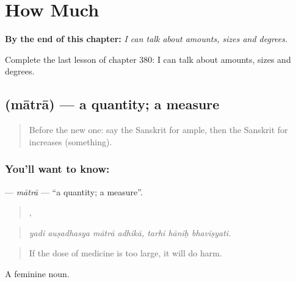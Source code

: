 
\chapter{How Much}
\label{ch:sa-how-much}

\begin{chapteropening}
\textbf{By the end of this chapter:} \emph{I can talk about amounts, sizes and degrees.}

Complete the last lesson of chapter 380: I can talk about amounts, sizes and degrees.
\end{chapteropening}

\section[\texorpdfstring{\sk{मात्रा} (mātrā)}{मात्रा (mātrā)}]{ (mātrā) — a quantity; a measure}

\label{lesson:SA-C380-matra}



\begin{quote}
Before the new one: say the Sanskrit for ample, then the Sanskrit for increases (something).
\end{quote}

\subsection*{You'll want to know: }
\textbf{} — \emph{mātrā} — \textquotedblleft{}a quantity; a measure\textquotedblright{}.

\begin{quote}
   ,   
\end{quote}

\begin{quote}
\emph{yadi auṣadhasya mātrā adhikā, tarhi hāniḥ bhaviṣyati.}
\end{quote}

\begin{quote}
If the dose of medicine is too large, it will do harm.
\end{quote}

A feminine noun.

